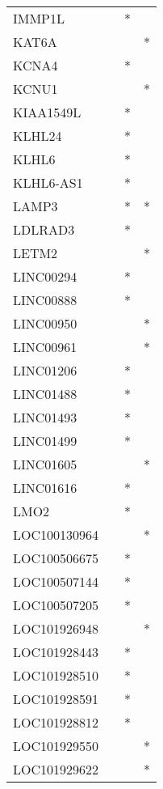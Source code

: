 \begin{longtable}{lccc}
IMMP1L        &       &  * &         \\
KAT6A         &       &    &       * \\
KCNA4         &       &  * &         \\
KCNU1         &       &    &       * \\
KIAA1549L     &       &  * &         \\
KLHL24        &       &  * &         \\
KLHL6         &       &  * &         \\
KLHL6-AS1     &       &  * &         \\
LAMP3         &       &  * &       * \\
LDLRAD3       &       &  * &         \\
LETM2         &       &    &       * \\
LINC00294     &       &  * &         \\
LINC00888     &       &  * &         \\
LINC00950     &       &    &       * \\
LINC00961     &       &    &       * \\
LINC01206     &       &  * &         \\
LINC01488     &       &  * &         \\
LINC01493     &       &  * &         \\
LINC01499     &       &  * &         \\
LINC01605     &       &    &       * \\
LINC01616     &       &  * &         \\
LMO2          &       &  * &         \\
LOC100130964  &       &    &       * \\
LOC100506675  &       &  * &         \\
LOC100507144  &       &  * &         \\
LOC100507205  &       &  * &         \\
LOC101926948  &       &    &       * \\
LOC101928443  &       &  * &         \\
LOC101928510  &       &  * &         \\
LOC101928591  &       &  * &         \\
LOC101928812  &       &  * &         \\
LOC101929550  &       &    &       * \\
LOC101929622  &       &    &       * \\

\end{longtable}

